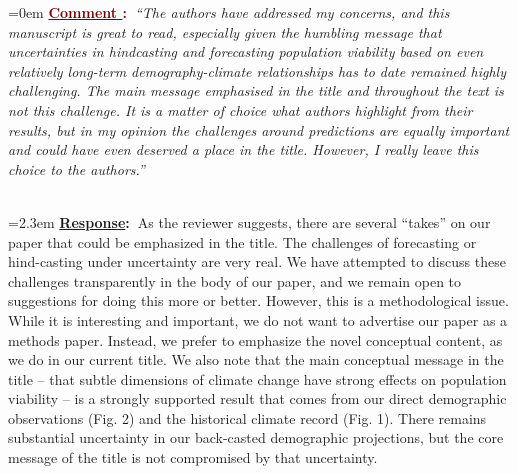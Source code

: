 \documentclass[12pt]{article}
\newcounter{cN}
\newcommand{\comment}[1]{
	\vspace{2em}
	\refstepcounter{cN} %
	\noindent \hangindent=0em \textbf{\textcolor{Maroon}{\uline{Comment \thecN}:~}}\emph{``#1''}
	}
\newcommand{\response}[1]{
	\\[0.25em]
	\hangindent=2.3em \textbf{\textcolor{NavyBlue}{\uline{Response}:~}}#1
	}
\begin{document}
\comment{The authors have addressed my concerns, and this manuscript is great to read, especially given the humbling message that uncertainties in hindcasting and forecasting population viability based on even relatively long-term demography-climate relationships has to date remained highly challenging. The main message emphasised in the title and throughout the text is not this challenge. It is a matter of choice what authors highlight from their results, but in my opinion the challenges around predictions are equally important and could have even deserved a place in the title. However, I really leave this choice to the authors.}
\response{As the reviewer suggests, there are several ``takes'' on our paper that could be emphasized in the title.
The challenges of forecasting or hind-casting under uncertainty are very real.
We have attempted to discuss these challenges transparently in the body of our paper, and we remain open to suggestions for doing this more or better. 
However, this is a methodological issue.
While it is interesting and important, we do not want to advertise our paper as a methods paper. 
Instead, we prefer to emphasize the novel conceptual content, as we do in our current title. 
We also note that the main conceptual message in the title -- that subtle dimensions of climate change have strong effects on population viability -- is a strongly supported result that comes from our direct demographic observations (Fig. 2) and the historical climate record (Fig. 1).
There remains substantial uncertainty in our back-casted demographic projections, but the core message of the title is not compromised by that uncertainty.}
\end{document}
